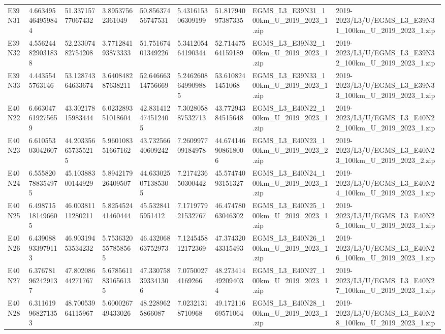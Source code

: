 \begin{landscape}
\begin{longtable}{lllllllll}
E39N31 & 4.663495464959844 & 51.33715777067432 & 3.89537562361049 & 50.85637456747531 & 5.431615306309199 & 51.81794097387335 & EGMS\_L3\_E39N31\_100km\_U\_2019\_2023\_1.zip & 2019-2023/L3/U/EGMS\_L3\_E39N31\_100km\_U\_2019\_2023\_1.zip \\
E39N32 & 4.556244829031838 & 52.23307482754208 & 3.771284193873333 & 51.75167401349226 & 5.341205464190344 & 52.71447564159189 & EGMS\_L3\_E39N32\_100km\_U\_2019\_2023\_1.zip & 2019-2023/L3/U/EGMS\_L3\_E39N32\_100km\_U\_2019\_2023\_1.zip \\
E39N33 & 4.4435545763146 & 53.12874364633674 & 3.640848287638211 & 52.64666314756669 & 5.2462608649909885 & 53.6108241451068 & EGMS\_L3\_E39N33\_100km\_U\_2019\_2023\_1.zip & 2019-2023/L3/U/EGMS\_L3\_E39N33\_100km\_U\_2019\_2023\_1.zip \\
E40N22 & 6.663047619275659 & 43.30217815983444 & 6.023289351018604 & 42.831412474512405 & 7.302805887532713 & 43.77294384515648 & EGMS\_L3\_E40N22\_100km\_U\_2019\_2023\_1.zip & 2019-2023/L3/U/EGMS\_L3\_E40N22\_100km\_U\_2019\_2023\_1.zip \\
E40N23 & 6.61055303042607 & 44.203356657355215 & 5.960108351667162 & 43.73256640609242 & 7.260997709184978 & 44.674146908618006 & EGMS\_L3\_E40N23\_100km\_U\_2019\_2023\_2.zip & 2019-2023/L3/U/EGMS\_L3\_E40N23\_100km\_U\_2019\_2023\_2.zip \\
E40N24 & 6.555820788354975 & 45.10388300144929 & 5.894217926409507 & 44.633025071385305 & 7.217423650300442 & 45.57474093151327 & EGMS\_L3\_E40N24\_100km\_U\_2019\_2023\_1.zip & 2019-2023/L3/U/EGMS\_L3\_E40N24\_100km\_U\_2019\_2023\_1.zip \\
E40N25 & 6.498715181496605 & 46.00381111280211 & 5.825452441460444 & 45.5328415951412 & 7.171977921532767 & 46.47478063046302 & EGMS\_L3\_E40N25\_100km\_U\_2019\_2023\_1.zip & 2019-2023/L3/U/EGMS\_L3\_E40N25\_100km\_U\_2019\_2023\_1.zip \\
E40N26 & 6.439088933979113 & 46.90319453534232 & 5.7536320557858565 & 46.43206863752973 & 7.124545812172369 & 47.37432043315493 & EGMS\_L3\_E40N26\_100km\_U\_2019\_2023\_1.zip & 2019-2023/L3/U/EGMS\_L3\_E40N26\_100km\_U\_2019\_2023\_1.zip \\
E40N27 & 6.376781962429137 & 47.80208644271767 & 5.6785611831656135 & 47.330758393341306 & 7.07500274169266 & 48.273414492094034 & EGMS\_L3\_E40N27\_100km\_U\_2019\_2023\_1.zip & 2019-2023/L3/U/EGMS\_L3\_E40N27\_100km\_U\_2019\_2023\_1.zip \\
E40N28 & 6.311619968271353 & 48.70053964115967 & 5.600026749433026 & 48.2289625866087 & 7.02321318710968 & 49.17211669571064 & EGMS\_L3\_E40N28\_100km\_U\_2019\_2023\_1.zip & 2019-2023/L3/U/EGMS\_L3\_E40N28\_100km\_U\_2019\_2023\_1.zip \\

\end{longtable}
\end{landscape}
